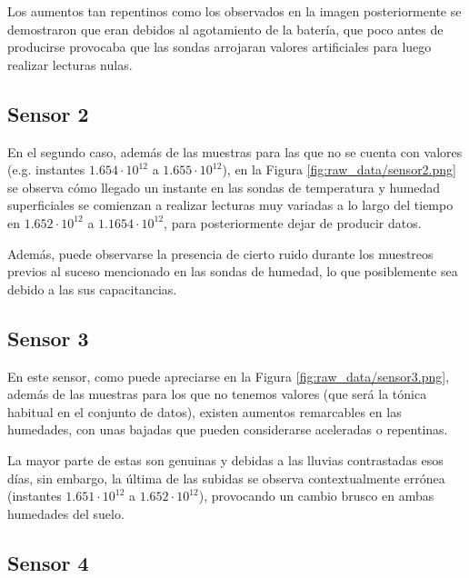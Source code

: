Los aumentos tan repentinos como los observados en la imagen posteriormente se demostraron
que eran debidos al agotamiento de la batería, que poco antes
de producirse provocaba que las sondas arrojaran valores artificiales para luego realizar lecturas nulas.

\subsection{Sensor 2}


En el segundo caso, además de las muestras para las que no se cuenta con valores (e.g. 
instantes \(1.654 \cdot 10^{12}\) a \(1.655 \cdot 10^{12}\)),
en la Figura \ref{fig:raw_data/sensor2.png} se observa cómo llegado un instante en
las sondas de temperatura y humedad superficiales se comienzan a realizar lecturas
muy variadas a lo largo del tiempo en \(1.652 \cdot 10^{12}\) a \(1.1654 \cdot 10^{12}\), para posteriormente dejar de producir datos.

Además, puede observarse la presencia de cierto ruido durante los muestreos previos
al suceso mencionado en las sondas de humedad, lo que posiblemente sea debido a 
las sus capacitancias.

\newpage
\subsection{Sensor 3}


En este sensor, como puede apreciarse en la Figura \ref{fig:raw_data/sensor3.png},
además de las muestras para los que no tenemos valores (que será la tónica habitual
en el conjunto de datos), existen aumentos remarcables en las humedades, con unas
bajadas que pueden considerarse aceleradas o repentinas.

La mayor parte de estas son genuinas y debidas a las lluvias contrastadas esos días, sin 
embargo, la última de las subidas se observa contextualmente errónea (instantes \(1.651 \cdot 10^{12}\) a \(1.652 \cdot 10^{12}\)), provocando 
un cambio brusco en ambas humedades del suelo.

\newpage
\subsection{Sensor 4}


